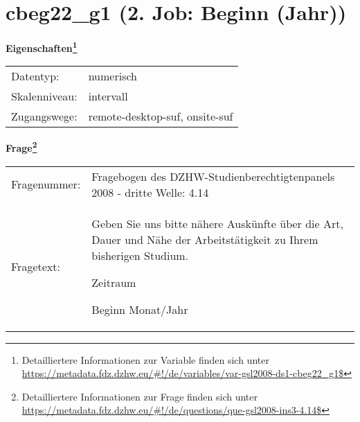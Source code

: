 
    \setcounter{footnote}{0}

    \vspace*{-1.8cm}
	\section{cbeg22\_g1 (2. Job: Beginn (Jahr))}
	\label{section:cbeg22_g1}



    \vspace*{0.5cm}
    \noindent\textbf{Eigenschaften\footnote{Detailliertere Informationen zur Variable finden sich unter
		\url{https://metadata.fdz.dzhw.eu/\#!/de/variables/var-gsl2008-ds1-cbeg22_g1$}}}\\
	\begin{tabularx}{\hsize}{@{}lX}
	Datentyp: & numerisch \\
	Skalenniveau: & intervall \\
	Zugangswege: &
	  remote-desktop-suf, 
	  onsite-suf
 \\
    \end{tabularx}



				\vspace*{0.5cm}
                \noindent\textbf{Frage\footnote{Detailliertere Informationen zur Frage finden sich unter
		              \url{https://metadata.fdz.dzhw.eu/\#!/de/questions/que-gsl2008-ins3-4.14$}}}\\
				\begin{tabularx}{\hsize}{@{}lX}
					Fragenummer: &
					  Fragebogen des DZHW-Studienberechtigtenpanels 2008 - dritte Welle:
					  4.14
 \\
					Fragetext: & Geben Sie uns bitte nähere Auskünfte über die Art, Dauer und Nähe der Arbeitstätigkeit zu Ihrem bisherigen Studium.\par  Zeitraum\par  Beginn Monat/Jahr \\
				\end{tabularx}





